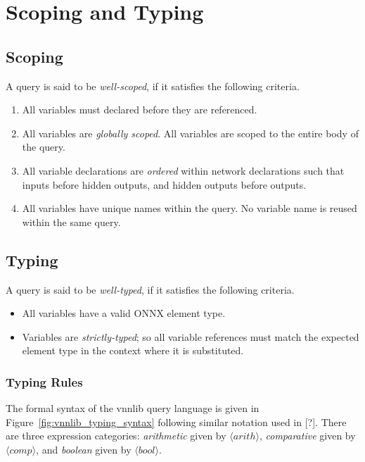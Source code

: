 \section{Scoping and Typing}
\label{sec:scoping_and_typing}

\subsection{Scoping}
A \vnnlib{} query is said to be \textit{well-scoped}, if it satisfies the following criteria.
\begin{enumerate}
    \item All variables must declared before they are referenced.
    \item All variables are \textit{globally scoped}. All variables are scoped to the entire body of the query.
    \item All variable declarations are \textit{ordered} within network declarations such that inputs before hidden outputs, and hidden outputs before outputs.
    \item All variables have unique names within the query. No variable name is reused within the same query.
\end{enumerate}

\subsection{Typing}
A \vnnlib{} query is said to be \textit{well-typed}, if it satisfies the following criteria.

\begin{itemize}
    \item All variables have a valid ONNX element type.
    \item Variables are \textit{strictly-typed}; so all variable references must match the expected element type in the context where it is substituted.
\end{itemize}

\subsubsection*{Typing Rules}
The formal syntax of the vnnlib{} query language is given in Figure~\ref{fig:vnnlib_typing_syntax} following similar notation used in [?].
There are three expression categories: \textit{arithmetic} given by \(\langle arith \rangle\), \textit{comparative} given by \(\langle comp \rangle\), and \textit{boolean} given by \(\langle bool \rangle\).


